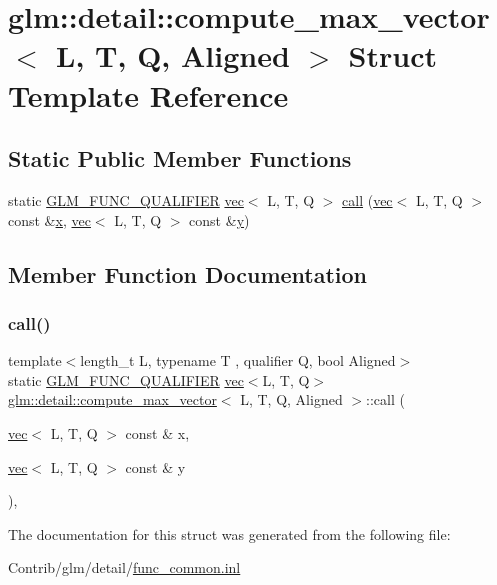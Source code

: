 \hypertarget{structglm_1_1detail_1_1compute__max__vector}{}\section{glm\+:\+:detail\+:\+:compute\+\_\+max\+\_\+vector$<$ L, T, Q, Aligned $>$ Struct Template Reference}
\label{structglm_1_1detail_1_1compute__max__vector}
\subsection*{Static Public Member Functions}
\begin{DoxyCompactItemize}
\item 
static \mbox{\hyperlink{setup_8hpp_a33fdea6f91c5f834105f7415e2a64407}{G\+L\+M\+\_\+\+F\+U\+N\+C\+\_\+\+Q\+U\+A\+L\+I\+F\+I\+ER}} \mbox{\hyperlink{structglm_1_1vec}{vec}}$<$ L, T, Q $>$ \mbox{\hyperlink{structglm_1_1detail_1_1compute__max__vector_a8eb01a7ef3c3e1898a1d2ddbb66168d9}{call}} (\mbox{\hyperlink{structglm_1_1vec}{vec}}$<$ L, T, Q $>$ const \&\mbox{\hyperlink{_s_d_l__opengl_8h_ad0e63d0edcdbd3d79554076bf309fd47}{x}}, \mbox{\hyperlink{structglm_1_1vec}{vec}}$<$ L, T, Q $>$ const \&\mbox{\hyperlink{_s_d_l__opengl_8h_a1675d9d7bb68e1657ff028643b4037e3}{y}})
\end{DoxyCompactItemize}


\subsection{Member Function Documentation}
\mbox{\label{structglm_1_1detail_1_1compute__max__vector_a8eb01a7ef3c3e1898a1d2ddbb66168d9}} 
\subsubsection{\texorpdfstring{call()}{call()}}
{\footnotesize\ttfamily template$<$length\+\_\+t L, typename T , qualifier Q, bool Aligned$>$ \\
static \mbox{\hyperlink{setup_8hpp_a33fdea6f91c5f834105f7415e2a64407}{G\+L\+M\+\_\+\+F\+U\+N\+C\+\_\+\+Q\+U\+A\+L\+I\+F\+I\+ER}} \mbox{\hyperlink{structglm_1_1vec}{vec}}$<$L, T, Q$>$ \mbox{\hyperlink{structglm_1_1detail_1_1compute__max__vector}{glm\+::detail\+::compute\+\_\+max\+\_\+vector}}$<$ L, T, Q, Aligned $>$\+::call (\begin{DoxyParamCaption}\item[{\mbox{\hyperlink{structglm_1_1vec}{vec}}$<$ L, T, Q $>$ const \&}]{x,  }\item[{\mbox{\hyperlink{structglm_1_1vec}{vec}}$<$ L, T, Q $>$ const \&}]{y }\end{DoxyParamCaption})\hspace{0.3cm}{\ttfamily [inline]}, {\ttfamily [static]}}



The documentation for this struct was generated from the following file\+:\begin{DoxyCompactItemize}
\item 
Contrib/glm/detail/\mbox{\hyperlink{func__common_8inl}{func\+\_\+common.\+inl}}\end{DoxyCompactItemize}
